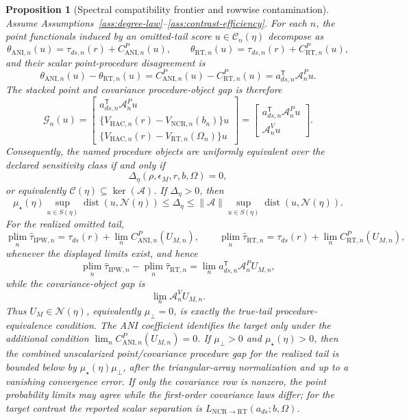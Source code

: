 \documentclass[11pt]{article}
\newcommand{\transpose}{\mathsf{T}}
\newcommand{\plim}{\operatorname*{plim}}
\theoremstyle{definition}
\theoremstyle{plain}
\newtheorem{proposition}{Proposition}
\theoremstyle{remark}
\begin{document}
\begin{proposition}[Spectral compatibility frontier and rowwise contamination]\label{thm:spectral-frontier}
Assume Assumptions~\ref{ass:degree-law}--\ref{ass:contrast-efficiency}.  For
each \(n\), the point functionals induced by an omitted-tail score
\(u\in\mathcal C_n(\eta)\) decompose as
\[
  \theta_{\mathrm{ANI},n}(u)
  =
  \tau_{ds,n}(r)+C^P_{\mathrm{ANI},n}(u),
  \qquad
  \theta_{\mathrm{RT},n}(u)
  =
  \tau_{ds,n}(r)+C^P_{\mathrm{RT},n}(u),
\]
and their scalar point-procedure disagreement is
\[
  \theta_{\mathrm{ANI},n}(u)-\theta_{\mathrm{RT},n}(u)
  =
  C^P_{\mathrm{ANI},n}(u)-C^P_{\mathrm{RT},n}(u)
  =
  a_{ds,n}^{\transpose}\mathcal A^P_nu.
\]
The stacked point and covariance procedure-object gap is therefore
\[
  \mathcal G_n(u)
  =
  \begin{bmatrix}
  a_{ds,n}^{\transpose}\mathcal A^P_nu\\
  \{V_{\mathrm{HAC},n}(r)-V_{\mathrm{NCR},n}(b_n)\}u\\
  \{V_{\mathrm{HAC},n}(r)-V_{\mathrm{RT},n}(\Omega_n)\}u
  \end{bmatrix}
  =
  \begin{bmatrix}
  a_{ds,n}^{\transpose}\mathcal A^P_nu\\
  \mathcal A^V_nu
  \end{bmatrix}.
\]
Consequently, the named procedure objects are uniformly equivalent over the
declared sensitivity class if and only if
\[
  \Delta_\eta(\rho,\epsilon_M,r,b,\Omega)=0,
\]
or equivalently \(\mathcal C(\eta)\subseteq\ker(\mathcal A)\).  If
\(\Delta_\eta>0\), then
\[
  \mu_\star(\eta)
  \sup_{u\in S(\eta)}\operatorname{dist}(u,\mathcal N(\eta))
  \le
  \Delta_\eta
  \le
  \|\mathcal A\|
  \sup_{u\in S(\eta)}\operatorname{dist}(u,\mathcal N(\eta)).
\]
For the realized omitted tail,
\[
  \plim_n \hat\tau_{\mathrm{IPW},n}
  =
  \tau_{ds}(r)+\lim_n C^P_{\mathrm{ANI},n}(U_{M,n}),
  \qquad
  \plim_n \hat\tau_{\mathrm{RT},n}
  =
  \tau_{ds}(r)+\lim_n C^P_{\mathrm{RT},n}(U_{M,n}),
\]
whenever the displayed limits exist, and hence
\[
  \plim_n \hat\tau_{\mathrm{IPW},n}
  -
  \plim_n \hat\tau_{\mathrm{RT},n}
  =
  \lim_n a_{ds,n}^{\transpose}\mathcal A^P_nU_{M,n},
\]
while the covariance-object gap is
\[
  \lim_n \mathcal A^V_nU_{M,n}.
\]
Thus \(U_M\in\mathcal N(\eta)\), equivalently \(\mu_\perp=0\), is exactly the
true-tail procedure-equivalence condition.  The ANI coefficient identifies
the target only under the additional condition
\(\lim_nC^P_{\mathrm{ANI},n}(U_{M,n})=0\).  If \(\mu_\perp>0\) and
\(\mu_\star(\eta)>0\), then the combined unscalarized point/covariance
procedure gap for the realized tail is bounded below by
\(\mu_\star(\eta)\mu_\perp\), after the triangular-array normalization and up
to a vanishing convergence error.  If only the covariance row is nonzero, the
point probability limits may agree while the first-order covariance laws
differ; for the target contrast the reported scalar separation is
\(L_{\mathrm{NCR}\to\mathrm{RT}}(a_{ds};b,\Omega)\).
\end{proposition}
\end{document}
